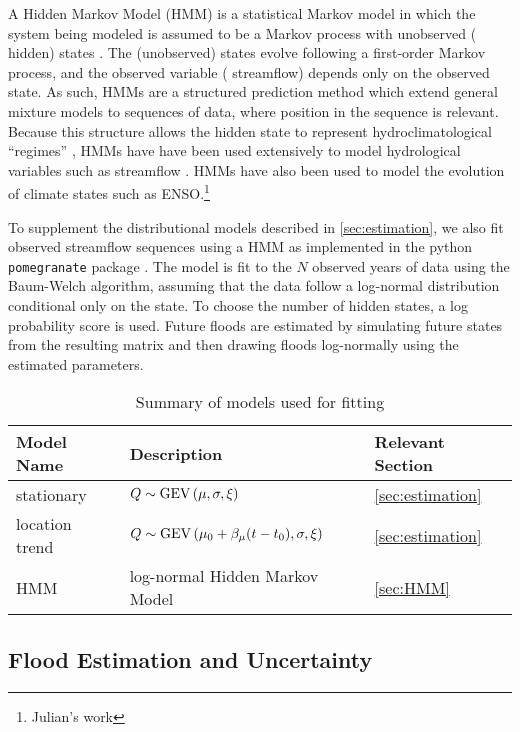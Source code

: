 \documentclass[11pt]{article}
\begin{document}
A Hidden Markov Model (HMM) is a statistical Markov model in which the system being modeled is assumed to be a Markov process with unobserved (\ie{} hidden) states \citep{Rabiner1986}.
The (unobserved) states evolve following a first-order Markov process, and the observed variable (\ie{} streamflow) depends only on the observed state.
As such, HMMs are a structured prediction method which extend general mixture models to sequences of data, where position in the sequence is relevant.
Because this structure allows the hidden state to represent hydroclimatological ``regimes'' \citep{Reinhold1982,Michelangeli1995,Merz2014}, HMMs have have been used extensively to model hydrological variables such as streamflow \citep{Bracken2016}.
HMMs have also been used to model the evolution of climate states such as ENSO.\footnote{Julian's work}

To supplement the distributional models described in \cref{sec:estimation}, we also fit observed streamflow sequences using a HMM as implemented in the python \texttt{pomegranate} package \citep{Schreiber2016}.
The model is fit to the \(N\) observed years of data using the Baum-Welch algorithm, assuming that the data follow a log-normal distribution conditional only on the state.
To choose the number of hidden states, a log probability score is used.
Future floods are estimated by simulating future states from the resulting matrix and then drawing floods log-normally using the estimated parameters.

\begin{table}[b]
  \begin{center}
    \begin{tabular}{L{1.0in} L{3.0in} L{1.5in}}
      \toprule
        Model Name & Description & Relevant Section \\
      \midrule
        stationary & \(Q \sim \operatorname{GEV} \qty(\mu, \sigma, \xi)\) & \cref{sec:estimation} \\
        location trend & \(Q \sim \operatorname{GEV} \qty(\mu_0 + \beta_\mu \qty(t-t_0), \sigma, \xi)\) & \cref{sec:estimation} \\
        HMM & log-normal Hidden Markov Model & \cref{sec:HMM} \\
      \bottomrule
    \end{tabular}
  \end{center}
  \caption{Summary of models used for fitting\label{tab:model-fitting}}
\end{table}


\subsection{Flood Estimation and Uncertainty}
\end{document}
